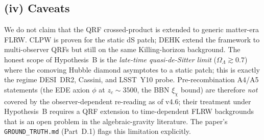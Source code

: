\subsection*{(iv) Caveats}

We do not claim that the QRF crossed-product is extended to generic matter-era
FLRW. CLPW is proven for the static dS patch; DEHK extend the framework to
multi-observer QRFs but still on the same Killing-horizon background. The
honest scope of Hypothesis~B is the \emph{late-time quasi-de-Sitter limit}
($\Omega_\Lambda \gtrsim 0.7$) where the comoving Hubble diamond
asymptotes to a static patch; this is exactly the regime DESI~DR2, Cassini,
and LSST~Y10 probe. Pre-recombination A4/A5 statements (the EDE axion $\phi$ at
$z_c\sim3500$, the BBN $\xi_\chi$ bound) are therefore \emph{not} covered by
the observer-dependent re-reading as of v4.6; their treatment under Hypothesis~B
requires a QRF extension to time-dependent FLRW backgrounds that is an open
problem in the algebraic-gravity literature. The paper's
\texttt{GROUND\_TRUTH.md} (Part~D.1) flags this limitation explicitly.
